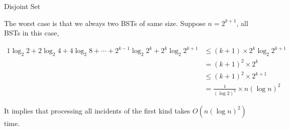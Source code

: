 \begin{homeworkProblem}{Disjoint Set}
\begin{enumerate}[label=(\arabic*)]
            The worst case is that we always  two BSTs of same size. 
            Suppose $n = 2^{k+1}$,  all BSTs in this case, 

            \begin{align*}
                1 \log_2{2} + 2 \log_2{4} + 4 \log_2{8} + \cdots + 2^{k-1} \log_2{2^k} + 2^k \log_2{2^{k+1}} &\leq (k+1) \times 2^k \log_2{2^{k+1}}  \\
                &= (k+1)^2 \times 2^k \\
                &\leq (k+1)^2 \times 2^{k+1} \\
                &= \frac{1}{(\log2)^2} \times n (\log n)^2
            \end{align*}

            It implies that processing all incidents of the first kind takes $O(n(\log n)^2)$ time.

    \end{enumerate}
\end{homeworkProblem}


